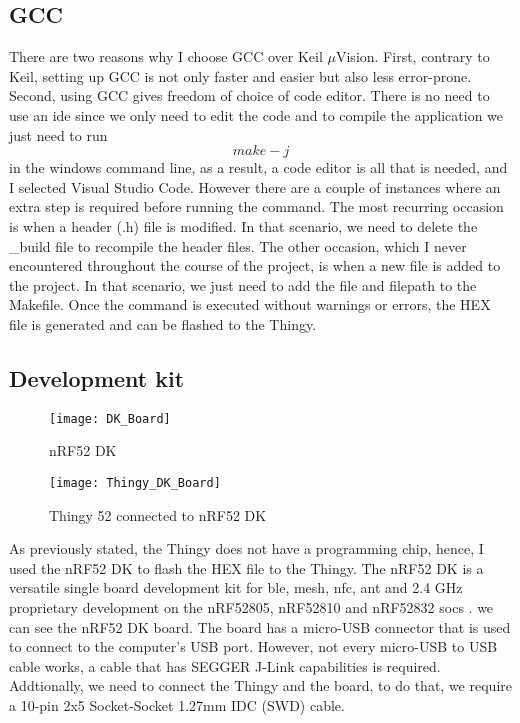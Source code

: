 \subsection{GCC}
There are two reasons why I choose GCC over Keil $\mu${Vision}. First, contrary to Keil, setting up GCC is not only faster and easier but also less error-prone. Second, using GCC gives freedom of choice of code editor. There is no need to use an \gls{ide} since we only need to edit the code and to compile the application we just need to run
\begin{equation*}
	make -j
\end{equation*}
in the windows command line, as a result, a code editor is all that is needed, and I selected Visual Studio Code. However there are a couple of instances where an extra step is required before running the command. The most recurring occasion is when a header (.h) file is modified. In that scenario, we need to delete the \_build file to recompile the header files. The other occasion, which I never encountered throughout the course of the project, is when a new file is added to the project. In that scenario, we just need to add the file and filepath to the Makefile. Once the command is executed without warnings or errors, the HEX file is generated and can be flashed to the Thingy. 

\subsection{Development kit}\label{sc:dk}
\begin{figure}[hbt!]
	\centering
	\texttt{[image: DK\_Board]}
	\caption{nRF52 DK}
	\label{fig:dk_board}
\end{figure}
\begin{figure}[hbt!]
	\centering
	\texttt{[image: Thingy\_DK\_Board]}
	\caption{Thingy 52 connected to nRF52 DK}
	\label{fig:thingy_dk_board}
\end{figure}
As previously stated, the Thingy does not have a programming chip, hence, I used the nRF52 DK to flash the HEX file to the Thingy. The nRF52 DK is a versatile single board development kit for \gls{ble}, \bt mesh, \gls{nfc}, \gls{ant} and 2.4 GHz proprietary development on the nRF52805, nRF52810 and nRF52832 \gls{soc}s \cite{dkboard}.  we can see the nRF52 DK board. The board has a micro-USB connector that is used to connect to the computer's USB port. However, not every micro-USB to USB cable works, a cable that has SEGGER J-Link capabilities is required. Addtionally, we need to connect the Thingy and the board, to do that, we require a 10-pin 2x5 Socket-Socket 1.27mm IDC (SWD) cable.

